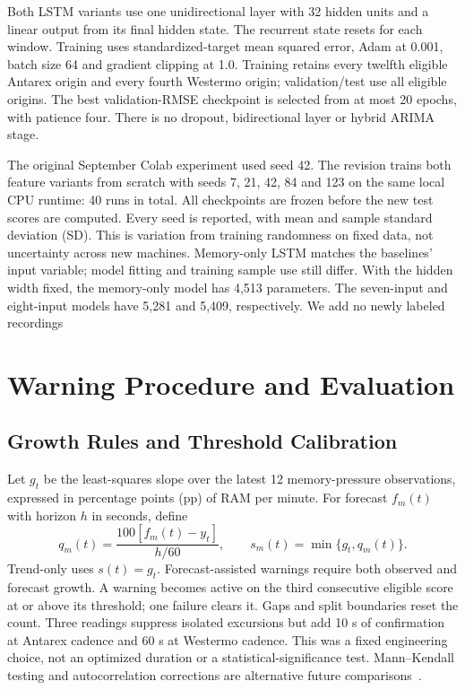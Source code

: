 \documentclass{llncs}
\begin{document}
Both LSTM variants use one unidirectional layer with 32 hidden units and a linear output from its final hidden state. The recurrent state resets for each window. Training uses standardized-target mean squared error, Adam at 0.001, batch size 64 and gradient clipping at 1.0. Training retains every twelfth eligible Antarex origin and every fourth Westermo origin; validation/test use all eligible origins. The best validation-RMSE checkpoint is selected from at most 20 epochs, with patience four. There is no dropout, bidirectional layer or hybrid ARIMA stage.

The original September Colab experiment used seed 42. The revision trains both feature variants from scratch with seeds 7, 21, 42, 84 and 123 on the same local CPU runtime: 40 runs in total. All checkpoints are frozen before the new test scores are computed. Every seed is reported, with mean and sample standard deviation (SD). This is variation from training randomness on fixed data, not uncertainty across new machines. Memory-only LSTM matches the baselines' input variable; model fitting and training sample use still differ. With the hidden width fixed, the memory-only model has 4,513 parameters. The seven-input and eight-input models have 5,281 and 5,409, respectively. We add no newly labeled recordings

\section{Warning Procedure and Evaluation}
\subsection{Growth Rules and Threshold Calibration}
Let $g_t$ be the least-squares slope over the latest 12 memory-pressure observations, expressed in percentage points (pp) of RAM per minute. For forecast $f_m(t)$ with horizon $h$ in seconds, define
\begin{equation}
q_m(t)=\frac{100[f_m(t)-y_t]}{h/60},\qquad
s_m(t)=\min\{g_t,q_m(t)\}.
\label{eq:score}
\end{equation}
Trend-only uses $s(t)=g_t$. Forecast-assisted warnings require both observed and forecast growth. A warning becomes active on the third consecutive eligible score at or above its threshold; one failure clears it. Gaps and split boundaries reset the count. Three readings suppress isolated excursions but add 10 s of confirmation at Antarex cadence and 60 s at Westermo cadence. This was a fixed engineering choice, not an optimized duration or a statistical-significance test. Mann--Kendall testing and autocorrelation corrections are alternative future comparisons~\cite{ref33,ref35}.
\end{document}
